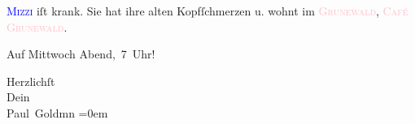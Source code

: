 \pstart
           \textsc{\textcolor{blue}{Mizzi}{}\ledrightnote{\textcolor{blue}{Marie Glümer}}} iſt krank. Sie {\pb}hat ihre alten Kopfſchmerzen
               u. wohnt im \textsc{\textcolor{pink}{Grunewald}{}\ledrightnote{\textcolor{pink}{Grunewald}}}, \textsc{\textcolor{pink}{Café Grunewald}{}\ledrightnote{\textcolor{pink}{Café Grunewald}}}.\pend
           
\pstart
           Auf Mittwoch{ }Abend, 7 Uhr!\pend
           
\pstart
           Herzlichſt {\\[\baselineskip]}Dein {\\[\baselineskip]}\spacefill\mbox{Paul Goldmn}\pend
           \leftskip=0em{}\endnumbering{}
\begin{anhang}
\end{anhang}
      